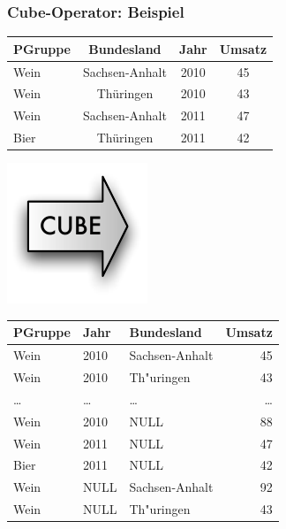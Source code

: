     \begin{frame}[shrink=10]
    
    \frametitle{Cube-Operator: Beispiel}
    
    \begin{minipage}{5.4cm}
    {\tiny
    \begin{tabular}{|l|c|c|c|}
    \hline
    \rowcolor{Gray} \textbf{PGruppe} & \textbf{Bundesland} & \textbf{Jahr} & \textbf{Umsatz} \\
    \hline\hline
    Wein & Sachsen-Anhalt & 2010 & 45 \\
    \hline
    Wein & Thüringen & 2010 & 43 \\
    \hline
    Wein & Sachsen-Anhalt & 2011 & 47 \\
    \hline
    Bier & Thüringen & 2011 & 42 \\
    \hline
    \end{tabular}}
    \end{minipage}%
    \begin{minipage}{1.4cm}
    \includegraphics[scale=.46]{fig3/Cube-Pfeil.pdf}
    \end{minipage}%
    \begin{minipage}{4cm}
    {\tiny
    \begin{tabular}{|l|l|l|r|}
    \hline
    \rowcolor{Gray} \textbf{PGruppe} & \textbf{Jahr} & \textbf{Bundesland} & \textbf{Umsatz} \\
    \hline\hline
     {Wein} &  {2010} &  {Sachsen-Anhalt} &  {45} \\
    \hline
     {Wein} &  {2010} &  {Th"uringen} &  {43} \\
    \hline
    \dots & \dots & \dots & \dots \\
    \hline
     {Wein} &  {2010} & {NULL} & {88} \\
    \hline
    {Wein} & {2011} & {NULL} & {47} \\
    \hline
    {Bier} & {2011} & {NULL} & {42} \\
    \hline
    {Wein} & {NULL} & {Sachsen-Anhalt} & {92} \\
    \hline
    {Wein} & {NULL} & {Th"uringen} & {43} \\

\end{tabular}}
\end{minipage}
\end{frame}
